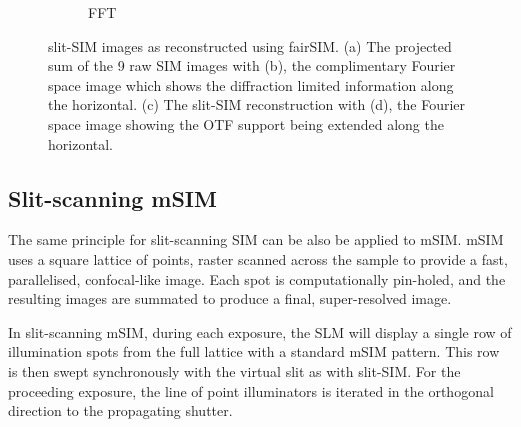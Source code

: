 \begin{figure}[h]
\begin{subfigure}[t]{0.23\textwidth}
      \caption{\gls{FFT}}
  \end{subfigure}
  \caption{slit-SIM images as reconstructed using fairSIM.
  (a) The projected sum of the 9 raw \gls{SIM} images with (b), the complimentary Fourier space image which shows the diffraction limited information along the horizontal.
  (c) The slit-SIM reconstruction with (d), the Fourier space image showing the OTF support being extended along the horizontal.
  }\label{fig:sim_slit_reconstructed}
\end{figure}

\subsection{Slit-scanning \gls{mSIM}}

The same principle for \gls{slit-scanning} \gls{SIM} can be also be applied to \gls{mSIM}.
\gls{mSIM} uses a square lattice of points, raster scanned across the sample to provide a fast, parallelised, confocal-like image.
Each spot is computationally pin-holed, and the resulting images are summated to produce a final, super-resolved image.

In \gls{slit-scanning} \gls{mSIM}, during each exposure, the \gls{SLM} will display a single row of illumination spots from the full lattice with a standard \gls{mSIM} pattern.
This row is then swept synchronously with the virtual slit as with slit-\gls{SIM}.
For the proceeding exposure, the line of point illuminators is iterated in the orthogonal direction to the propagating shutter.

